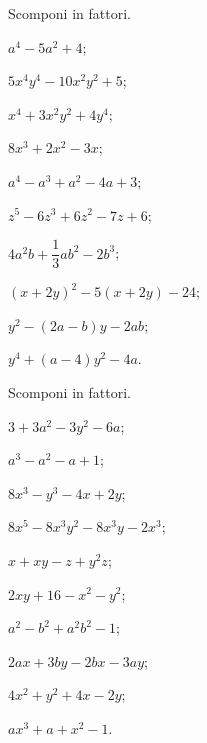 \begin{esercizio}[\Ast]
 \label{ese:13.117}
 Scomponi in fattori.
 \begin{multicols}{2}
 \begin{enumeratea}
\item $a^{4}-5a^{2}+4$;
\item $5x^{4}y^{4}-10x^{2}y^{2}+5$;
\item $x^{4}+3x^{2}y^{2}+4y^{4}$;
\item $8x^{3}+2x^{2}-3x$;
\item $a^{4}-a^{3}+a^{2}-4a+3$;
\item $z^{5}-6z^{3}+6z^{2}-7z+6$;
\item $4a^{2}b+\dfrac{1}{3}ab^{2}-2b^{3}$;
\item $(x+2y)^{2}-5(x+2y)-24$;
\item $y^{2}-(2a-b)y-2ab$;
\item $y^{4}+(a-4)y^{2}-4a$.
 \end{enumeratea}
 \end{multicols}
\end{esercizio}
\pagebreak
\begin{esercizio}[\Ast]
 \label{ese:13.118}
 Scomponi in fattori.
 \begin{multicols}{2}
 \begin{enumeratea}
\item $3+3a^{2}-3y^{2}-6a$;
\item $a^{3}-a^{2}-a+1$;
\item $8x^{3}-y^{3}-4x+2y$;
\item $8x^{5}-8x^{3}y^{2}-8x^{3}y-2x^{3}$;
\item $x+xy-z+y^{2}z$;
\item $2xy+16-x^{2}-y^{2}$;
\item $a^{2}-b^{2}+a^{2}b^{2}-1$;
\item $2ax+3by-2bx-3ay$;
\item $4x^{2}+y^{2}+4x-2y$;
\item $ax^{3}+a+x^{2}-1$.
 \end{enumeratea}
 \end{multicols}
\end{esercizio}

